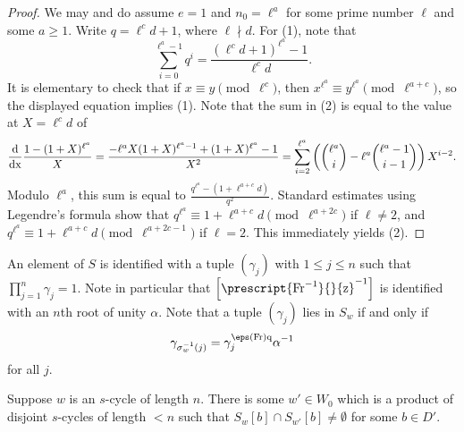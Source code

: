 \begin{proof}
    We may and do assume $e = 1$ and $n_0 = \ell^a$ for some prime number $\ell$ and some $a \geq 1$. Write $q = \ell^c d + 1$, where $\ell \nmid d$. For (1), note that
    \[
    \sum_{i=0}^{\ell^a - 1} q^i = \frac{(\ell^c d + 1)^{\ell^a} - 1}{\ell^c d}.
    \]
    It is elementary to check that if $x \equiv y \pmod{\ell^c}$, then $x^{\ell^a} \equiv y^{\ell^a} \pmod{\ell^{a+c}}$, so the displayed equation implies (1). Note that the sum in (2) is equal to the value at $X = \ell^c d$ of 
    \[
    \frac{\rm{d}}{\rm{d}x} \frac{1 - (1 + X)^{\ell^a}}{X} = \frac{-\ell^a X (1 + X)^{\ell^a - 1} + (1 + X)^{\ell^a} - 1}{X^2} = \sum_{i=2}^{\ell^a} \left({\ell^a \choose i} - \ell^a {\ell^a - 1 \choose i - 1}\right) X^{i - 2}.
    \]
    Modulo $\ell^a$, this sum is equal to $\frac{q^{\ell^a} - (1 + \ell^{a+c} d)}{q^2}$. Standard estimates using Legendre's formula show that $q^{\ell^a} \equiv 1 + \ell^{a+c} d \pmod{\ell^{a+2c}}$ if $\ell \neq 2$, and $q^{\ell^a} \equiv 1 + \ell^{a+c} d \pmod{\ell^{a + 2c - 1}}$ if $\ell = 2$. This immediately yields (2).
\end{proof}

An element of $S$ is identified with a tuple $(\gamma_j)$ with $1 \leq j \leq n$ such that $\prod_{j=1}^n \gamma_j = 1$. Note in particular that $\left[\prescript{\rm{Fr}^{-1}}{}{z}^{-1}\right]$ is identified with an $n$th root of unity $\alpha$. Note that a tuple $(\gamma_j)$ lies in $S_w$ if and only if
\[
\gamma_{\sigma_w^{-1}(j)} = \gamma_j^{\eps(\rm{Fr})q} \alpha^{-1}
\]
for all $j$.

\begin{lemma}\label{lemma:reduce-from-length-n}
    Suppose $w$ is an $s$-cycle of length $n$. There is some $w' \in W_0$ which is a product of disjoint $s$-cycles of length $< n$ such that $S_w[b] \cap S_{w'}[b] \neq \emptyset$ for some $b \in D'$.
\end{lemma}

